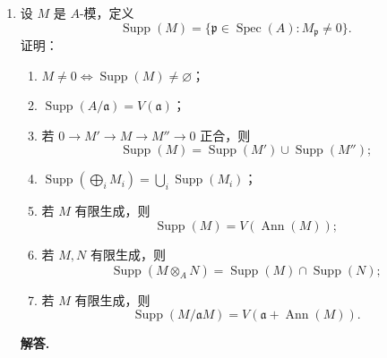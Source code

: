 \documentclass[a4paper]{ctexart}
\begin{document}
\begin{enumerate}[leftmargin=*, label=\textbf{3.\arabic*.}]
\begin{enumerate}[label=(\roman*)]
\item 由局部化的素理想对应，
\[
\operatorname{Spec}(S^{-1}A)\cong \{\mathfrak q\in \operatorname{Spec}(A):\mathfrak q\cap S=\varnothing\},
\]
这正是其在 \(\operatorname{Spec}(A)\) 中的像。
\item 识别 \(\operatorname{Spec}(S^{-1}A)\) 与其像后，局部化后的谱映射就是原 \(f^*\) 的限制。
\item 若 \(\mathfrak a\subseteq A\)，\(\mathfrak b=\mathfrak a^e\subseteq B\)，则
\[
\operatorname{Spec}(A/\mathfrak a)\cong V(\mathfrak a),\qquad
\operatorname{Spec}(B/\mathfrak b)\cong V(\mathfrak b),
\]
而诱导映射正是 \(f^*\) 在 \(V(\mathfrak b)\) 上的限制。
\item 取 \(S=A\setminus \mathfrak p\)，先局部化再模掉 \(S^{-1}\mathfrak p\)，便得
\[
f^{*-1}(\mathfrak p)\cong \operatorname{Spec}(B_{\mathfrak p}/\mathfrak p B_{\mathfrak p}).
\]
又因为
\[
B_{\mathfrak p}/\mathfrak p B_{\mathfrak p}\cong k(\mathfrak p)\otimes_A B,
\]
故得第二个同构。
\end{enumerate}

\setcounter{enumi}{18}
\item 设 \(M\) 是 \(A\)-模，定义
\[
\operatorname{Supp}(M)=\{\mathfrak p\in\operatorname{Spec}(A):M_{\mathfrak p}\neq 0\}.
\]
证明：
\begin{enumerate}[label=(\roman*)]
\item \(M\neq 0 \iff \operatorname{Supp}(M)\neq \varnothing\)；
\item \(\operatorname{Supp}(A/\mathfrak a)=V(\mathfrak a)\)；
\item 若 \(0\to M'\to M\to M''\to 0\) 正合，则
\[
\operatorname{Supp}(M)=\operatorname{Supp}(M')\cup \operatorname{Supp}(M'');
\]
\item \(\operatorname{Supp}(\bigoplus_i M_i)=\bigcup_i \operatorname{Supp}(M_i)\)；
\item 若 \(M\) 有限生成，则
\[
\operatorname{Supp}(M)=V(\operatorname{Ann}(M));
\]
\item 若 \(M,N\) 有限生成，则
\[
\operatorname{Supp}(M\otimes_A N)=\operatorname{Supp}(M)\cap \operatorname{Supp}(N);
\]
\item 若 \(M\) 有限生成，则
\[
\operatorname{Supp}(M/\mathfrak aM)=V(\mathfrak a+\operatorname{Ann}(M)).
\]
\end{enumerate}
\textbf{解答.}


\end{enumerate}
\end{document}
